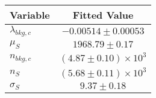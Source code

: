 \begin{tabular}[t]{lc}
\hline
Variable &Fitted Value\\
\hline\hline
$\lambda_{bkg,c}$&$-0.00514\pm0.00053$\\
\hline
$\mu_{S}$&$1968.79\pm0.17$\\
\hline
$n_{bkg,c}$&$(4.87\pm0.10)\times 10^3$\\
\hline
$n_{S}$&$(5.68\pm0.11)\times 10^3$\\
\hline
$\sigma_{S}$&$9.37\pm0.18$\\
\hline
\end{tabular}